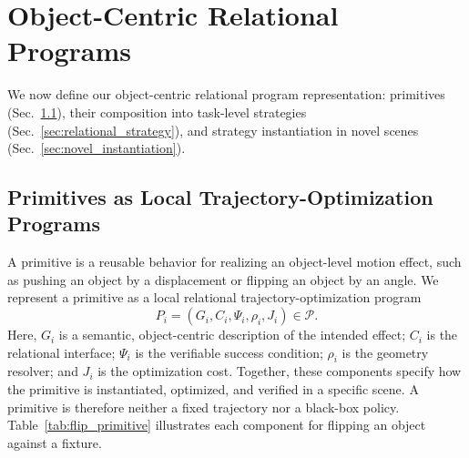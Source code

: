 \section{Object-Centric Relational Programs}
\label{sec:relational_programs}

We now define our object-centric relational program representation: primitives (Sec.~\ref{sec:relational_primitives}), their composition into task-level strategies (Sec.~\ref{sec:relational_strategy}), and strategy instantiation in novel scenes (Sec.~\ref{sec:novel_instantiation}).

\subsection{Primitives as Local Trajectory-Optimization Programs}
\label{sec:relational_primitives}
A primitive is a reusable behavior for realizing an object-level motion effect, such as pushing an object by a displacement or flipping an object by an angle. We represent a primitive as a local relational trajectory-optimization program
\begin{equation*}
    P_i=(G_i,C_i,\Psi_i,\rho_i,J_i)\in\mathcal{P}.
\end{equation*}
Here, $G_i$ is a semantic, object-centric description of the intended effect; $C_i$ is the relational interface; $\Psi_i$ is the verifiable success condition; $\rho_i$ is the geometry resolver; and $J_i$ is the optimization cost. Together, these components specify how the primitive is instantiated, optimized, and verified in a specific scene. A primitive is therefore neither a fixed trajectory nor a black-box policy. Table~\ref{tab:flip_primitive} illustrates each component for flipping an object against a fixture.

